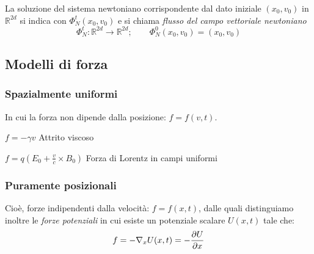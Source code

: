 \begin{definition}
    La soluzione del sistema newtoniano corrispondente dal dato iniziale $(x_0, v_0)$ in $\mathbb{R}^{2d}$ si indica con 
    $\Phi_N^t(x_0,v_0)$ e si chiama \textit{flusso del campo vettoriale newtoniano}
    \begin{equation}
        \Phi_N^t: \mathbb{R}^{2d}\rightarrow\mathbb{R}^{2d} ; \qquad \Phi_N^0 (x_0,v_0)= (x_0,v_0) 
    \end{equation}
\end{definition}





\subsection{Modelli di forza}

\subsubsection{Spazialmente uniformi}
In cui la forza non dipende dalla posizione: $f = f(v,t)$.
\begin{example}
    $f = -\gamma v $ Attrito viscoso
\end{example}
\begin{example}
    $f = q(E_0+ \frac{v}{c}\times B_0)$ Forza di Lorentz in campi uniformi
\end{example}



\subsubsection{Puramente posizionali}
Cioè, forze indipendenti dalla velocità: $f= f(x,t)$, dalle quali distinguiamo inoltre le \textit{forze potenziali} in cui esiste un potenziale scalare $U(x,t)$
tale che:
\begin{equation}
    f= -\nabla_xU(x,t)= -\pdv{U}{x}(x,t)
\end{equation}

